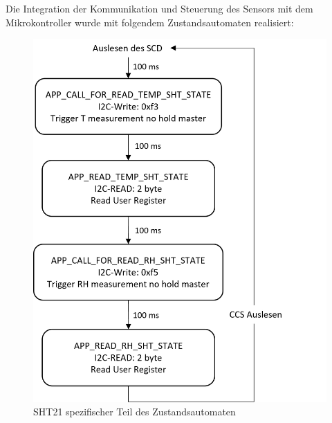 \documentclass[]{article}
\begin{document}
		Die Integration der Kommunikation und Steuerung des Sensors mit dem Mikrokontroller wurde mit folgendem Zustandsautomaten realisiert:
		\begin{figure}[!h]
			\centering
			\includegraphics[scale=0.8]{images/sht_zustand}
			\caption{SHT21 spezifischer Teil des Zustandsautomaten\cite{sht_datasheet}}
			\label{img:sht_zustand}
		\end{figure}
\end{document}
